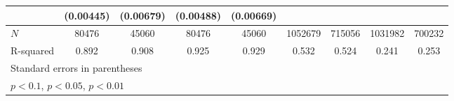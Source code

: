 {\begin{adjustbox}{max width=\textwidth}
\begin{tabular}{l*{8}{c}}
            &   (0.00445)         &   (0.00679)         &   (0.00488)         &   (0.00669)         &                     &                     &                     &                     \\
\midrule
\(N\)       &       80476         &       45060         &       80476         &       45060         &     1052679         &      715056         &     1031982         &      700232         \\
R-squared   &       0.892         &       0.908         &       0.925         &       0.929         &       0.532         &       0.524         &       0.241         &       0.253         \\
\bottomrule
\multicolumn{9}{l}{\footnotesize Standard errors in parentheses}\\
\multicolumn{9}{l}{\footnotesize \sym{*} \(p<0.1\), \sym{**} \(p<0.05\), \sym{***} \(p<0.01\)}\\
\end{tabular}
\end{adjustbox}
}
